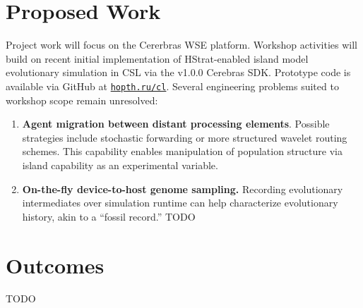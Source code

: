 \section{Proposed Work}

Project work will focus on the Cererbras WSE platform.
Workshop activities will build on recent initial implementation of HStrat-enabled island model evolutionary simulation in CSL via the v1.0.0 Cerebras SDK.
Prototype code is available via GitHub at \texttt{\href{https://hopth.ru/cl}{hopth.ru/cl}}.
Several engineering problems suited to workshop scope remain unresolved:
\begin{enumerate}
\item \textbf{Agent migration between distant processing elements}.
Possible strategies include stochastic forwarding or more structured wavelet routing schemes.
This capability enables manipulation of population structure via island capability as an experimental variable.

\item \textbf{On-the-fly device-to-host genome sampling.}
Recording evolutionary intermediates over simulation runtime can help characterize evolutionary history, akin to a ``fossil record.''
TODO
\end{enumerate}

\section{Outcomes}

TODO



